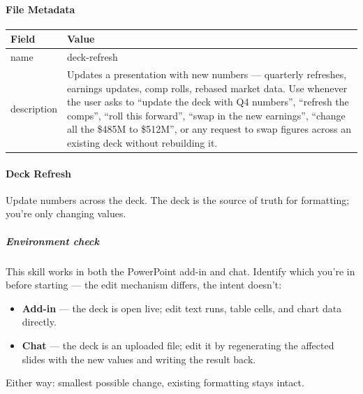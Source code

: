 \documentclass[11pt]{article}
\begin{document}
\paragraph{File Metadata}\mbox{}\par
\begingroup
\small
\setlength{\tabcolsep}{2pt}
\begin{longtable}{>{\RaggedRight\arraybackslash\hspace{0pt}}p{}>{\RaggedRight\arraybackslash\hspace{0pt}}p{}}
\toprule
{} \textbf{Field} & \textbf{Value} \\
\midrule
{} name & deck-refresh \\
{} description & Updates a presentation with new numbers — quarterly refreshes, earnings updates, comp rolls, rebased market data. Use whenever the user asks to ``update the deck with Q4 numbers'', ``refresh the comps'', ``roll this forward'', ``swap in the new earnings'', ``change all the \$485M to \$512M'', or any request to swap figures across an existing deck without rebuilding it. \\
\bottomrule
\end{longtable}
\endgroup


\paragraph{Deck Refresh}\mbox{}\par

Update numbers across the deck. The deck is the source of truth for formatting; you're only changing values.


\subparagraph{Environment check}\mbox{}\par

This skill works in both the PowerPoint add-in and chat. Identify which you're in before starting — the edit mechanism differs, the intent doesn't:


\begin{itemize}[leftmargin=*,itemsep=2pt,topsep=2pt]
\item {} \textbf{Add-in} — the deck is open live; edit text runs, table cells, and chart data directly.
\item {} \textbf{Chat} — the deck is an uploaded file; edit it by regenerating the affected slides with the new values and writing the result back.
\end{itemize}

Either way: smallest possible change, existing formatting stays intact.
\end{document}

